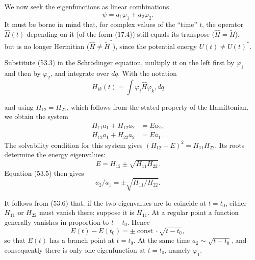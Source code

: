 We now seek the eigenfunctions as linear combinations
\begin{equation}
 \psi=a_1\varphi_1+a_2\varphi_2.
 \tag{53.3}
\end{equation}
It must be borne in mind that, for complex values of the ``time'' $t$, the operator $\widehat H(t)$ depending on it (of the form (17.4)) still equals its transpose ($\widehat H=\widetilde H$), but is no longer Hermitian ($\widehat H\ne\widetilde H^*$), since the potential energy $U(t)\ne U(t)^*$.

Substitute (53.3) in the Schrödinger equation, multiply it on the left first by $\varphi_1$ and then by $\varphi_2$, and integrate over $dq$. With the notation
\begin{equation}
 H_{ik}(t)=\int\varphi_i\widehat H\varphi_k,dq
 \tag{53.4}
\end{equation}

and using $H_{12}=H_{21}$, which follows from the stated property of the Hamiltonian, we obtain the system
\begin{equation}
 \begin{aligned}
 H_{11}a_1+H_{12}a_2&=Ea_2,\\
 H_{12}a_1+H_{22}a_2&=Ea_1.
 \end{aligned}
 \tag{53.5}
\end{equation}
The solvability condition for this system gives $(H_{12}-E)^2=H_{11}H_{22}$. Its roots determine the energy eigenvalues:
\begin{equation}
 E=H_{12}\pm\sqrt{H_{11}H_{22}}.
 \tag{53.6}
\end{equation}
Equation (53.5) then gives
\begin{equation}
 a_2/a_1=\pm\sqrt{H_{11}/H_{22}}.
 \tag{53.7}
\end{equation}

It follows from (53.6) that, if the two eigenvalues are to coincide at $t=t_0$, either $H_{11}$ or $H_{22}$ must vanish there; suppose it is $H_{11}$. At a regular point a function generally vanishes in proportion to $t-t_0$. Hence
\begin{equation}
 E(t)-E(t_0)=\pm\operatorname{const}\cdot\sqrt{t-t_0},
 \tag{53.8}
\end{equation}
so that $E(t)$ has a branch point at $t=t_0$. At the same time $a_2\sim\sqrt{t-t_0}$, and consequently there is only one eigenfunction at $t=t_0$, namely $\varphi_1$.

